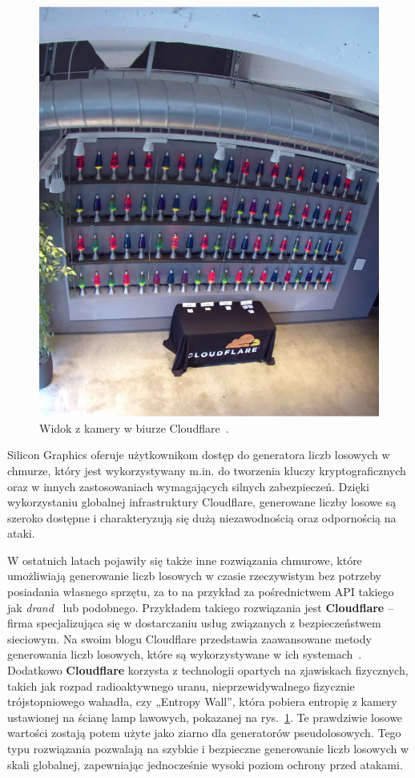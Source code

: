 \begin{figure}[h]
    \centering
    \includegraphics[width=0.4\linewidth]{chapters/02-teoria/figures/lavarandCamera}
    \caption{Widok z kamery w biurze Cloudflare~\cite{cloudflare_lavarand}.}
    \label{fig:lavarand}
\end{figure}

Silicon Graphics oferuje użytkownikom dostęp do generatora liczb losowych w chmurze, który jest wykorzystywany
m.in. do tworzenia kluczy kryptograficznych oraz w innych zastosowaniach wymagających silnych zabezpieczeń.
Dzięki wykorzystaniu globalnej infrastruktury Cloudflare, generowane liczby losowe są
szeroko dostępne i charakteryzują się dużą niezawodnością oraz odpornością na ataki.

W ostatnich latach pojawiły się także inne rozwiązania chmurowe, które umożliwiają generowanie liczb losowych w czasie rzeczywistym bez potrzeby posiadania własnego sprzętu,
za to na przykład za pośrednictwem API takiego jak \textit{drand}~\cite{drand_documentation} lub podobnego.
Przykładem takiego rozwiązania jest \textbf{Cloudflare} – firma specjalizująca się w dostarczaniu usług związanych z bezpieczeństwem sieciowym.
Na swoim blogu Cloudflare przedstawia zaawansowane metody generowania liczb losowych, które są wykorzystywane w ich systemach~\cite{cloudflare_league_of_entropy}.
Dodatkowo \textbf{Cloudflare} korzysta z technologii opartych na zjawiskach fizycznych, takich jak rozpad radioaktywnego uranu, 
nieprzewidywalnego fizycznie trójstopniowego wahadła, czy „Entropy Wall”, która pobiera entropię z kamery
ustawionej na ścianę lamp lawowych, pokazanej na rys.~\ref{fig:lavarand}.
Te prawdziwie losowe wartości zostają potem użyte jako ziarno dla generatorów pseudolosowych.
Tego typu rozwiązania pozwalają na szybkie i bezpieczne generowanie liczb losowych w skali globalnej, zapewniając jednocześnie wysoki poziom ochrony przed atakami.

